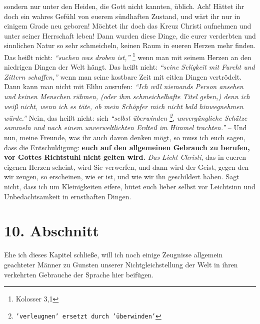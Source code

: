 sondern nur unter den Heiden, die
Gott nicht kannten, üblich. Ach! Hättet ihr doch ein wahres Gefühl von euerem
sündhaften Zustand, und wärt ihr nur in einigem
Grade neu geboren! Möchtet ihr
doch das Kreuz Christi aufnehmen und unter seiner
Herrschaft leben! Dann wurden
diese Dinge, die eurer verderbten und sinnlichen
Natur so sehr schmeicheln,
keinen Raum in eueren Herzen mehr finden. Das heißt nicht:
\textit{"`suchen was droben ist,"'}
\footnote{Kolosser 3,1}
wenn man mit seinem Herzen an den niedrigen Dingen der Welt hängt. Das
heißt nicht:
\textit{"`seine Seligkeit mit Furcht und Zittern schaffen,"'} wenn man
seine kostbare Zeit mit eitlen Dingen vertrödelt. Dann kann man nicht mit
Elihu
ausrufen:
\textit{"`Ich will niemands Person ansehen und keinen Menschen rühmen, (oder
ihm schmeichelhafte Titel geben,) denn ich weiß nicht, wenn ich es täte, ob
mein Schöpfer mich nicht bald hinwegnehmen würde."'}
Nein, das heißt nicht: sich
\textit{"`selbst überwinden
\footnote{\texttt{'verleugnen' ersetzt durch 'überwinden'}}, unvergängliche
Schätze sammeln und nach einem
unverweltlichten Erdteil im Himmel trachten."'} -- Und nun, meine Freunde, was
ihr auch davon denken mögt, so muss ich euch sagen, dass die Entschuldigung:
\textbf{euch
auf den allgemeinen Gebrauch zu berufen, vor Gottes Richtstuhl nicht gelten
wird.} \textit{Das Licht Christi}, das in eueren eigenen Herzen
scheint, wird Sie
verwerfen, und dann wird der Geist, gegen den wir zeugen, so erscheinen, wie er
ist, und wie wir ihn geschildert haben. Sagt nicht, dass ich um Kleinigkeiten
eifere, hütet euch lieber selbst vor Leichtsinn und Unbedachtsamkeit in
ernsthaften Dingen.

\section{10. Abschnitt} \label{kap10_ab10}

Ehe ich dieses Kapitel schließe, will ich noch einige Zeugnisse allgemein
geachteter Männer zu Gunsten unserer Nichtgleichstellung der Welt in ihren
verkehrten Gebrauche der Sprache hier beifügen.

\medskip

